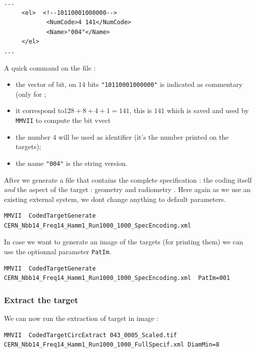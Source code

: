 \begin{lstlisting}
...
     <el>  <!--10110001000000-->
            <NumCode>4 141</NumCode>
            <Name>"004"</Name>
     </el>
...
\end{lstlisting}

A quick command on the file :

\begin{itemize}
	\item the vector of bit, on $14$ bits  {\tt "10110001000000"} is indicated
		as  commentary (only for ;
        \item it correspond to$128+8+4+1=141$, this is $141$ which is saved
		and used by {\tt MMVII} to compute the bit vvect
	\item  the  number $4$ will be used as identifier  (it's the number printed on the targets);
	\item  the  name {\tt "004"} is the string version.
\end{itemize}

After we generate a file that contains the complete specification : the coding itself
\emph{and} the aspect of the target : geometry and radiometry .  Here again
as we use an existing external system, we dont change anything to default parameters.

\begin{lstlisting}
MMVII  CodedTargetGenerate  CERN_Nbb14_Freq14_Hamm1_Run1000_1000_SpecEncoding.xml
\end{lstlisting}

In case we want to generate an image of the targets (for printing them) we can
use the optionnal parameter {\tt PatIm}.

\begin{lstlisting}
MMVII  CodedTargetGenerate  CERN_Nbb14_Freq14_Hamm1_Run1000_1000_SpecEncoding.xml  PatIm=001
\end{lstlisting}


\subsubsection{Extract the target}

We can now run the extraction of target in image :

\begin{lstlisting}
MMVII  CodedTargetCircExtract 043_0005_Scaled.tif CERN_Nbb14_Freq14_Hamm1_Run1000_1000_FullSpecif.xml DiamMin=8
\end{lstlisting}


